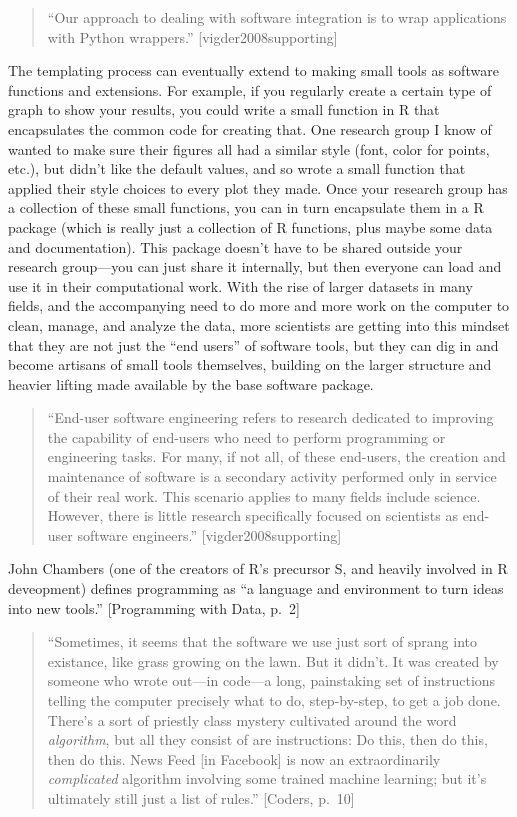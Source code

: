 \documentclass[]{tufte-book}
\begin{document}
\begin{quote}
``Our approach to dealing with software integration is to wrap applications with Python
wrappers.'' {[}vigder2008supporting{]}
\end{quote}

The templating process can eventually extend to making small tools as software functions
and extensions. For example, if you regularly create a certain type of graph to show
your results, you could write a small function in R that encapsulates the common code
for creating that. One research group I know of wanted to make sure their figures all
had a similar style (font, color for points, etc.), but didn't like the default values,
and so wrote a small function that applied their style choices to every plot they made.
Once your research group has a collection of these small functions, you can in turn
encapsulate them in a R package (which is really just a collection of R functions, plus
maybe some data and documentation). This package doesn't have to be shared outside your
research group---you can just share it internally, but then everyone can load and use
it in their computational work. With the rise of larger datasets in many fields, and the
accompanying need to do more and more work on the computer to clean, manage, and
analyze the data, more scientists are getting into this mindset that they are not just
the ``end users'' of software tools, but they can dig in and become artisans of small tools
themselves, building on the larger structure and heavier lifting made available by the
base software package.

\begin{quote}
``End-user software engineering refers to research dedicated to improving the
capability of end-users who need to perform programming or engineering tasks. For many,
if not all, of these end-users, the creation and maintenance of software is a
secondary activity performed only in service of their real work. This scenario
applies to many fields include science. However, there is little research specifically
focused on scientists as end-user software engineers.'' {[}vigder2008supporting{]}
\end{quote}

John Chambers (one of the creators of R's precursor S, and heavily involved in R
deveopment) defines programming as ``a language and environment to turn ideas into new
tools.'' {[}Programming with Data, p.~2{]}

\begin{quote}
``Sometimes, it seems that the software we use just sort of sprang into
existance, like grass growing on the lawn. But it didn't. It was created by
someone who wrote out---in code---a long, painstaking set of instructions
telling the computer precisely what to do, step-by-step, to get a job done.
There's a sort of priestly class mystery cultivated around the word \emph{algorithm},
but all they consist of are instructions: Do this, then do this, then do this.
News Feed {[}in Facebook{]} is now an extraordinarily \emph{complicated} algorithm
involving some trained machine learning; but it's ultimately still just a list
of rules.'' {[}Coders, p.~10{]}
\end{quote}
\end{document}
